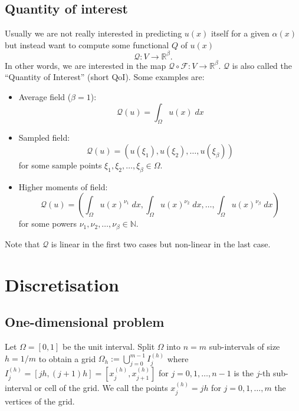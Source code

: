 \documentclass[11pt]{article}
\begin{document}
\subsection{Quantity of interest}
Usually we are not really interested in predicting $u(x)$ itself for a given $\alpha(x)$ but instead want to compute some functional $Q$ of $u(x)$
\begin{equation}
    \mathcal{Q}: V\rightarrow \mathbb{R}^\beta.\label{eqn:QoI}
\end{equation}
In other words, we are interested in the map $\mathcal{Q}\circ \mathcal{F}:V\rightarrow \mathbb{R}^\beta$. $\mathcal{Q}$ is also called the ``Quantity of Interest'' (short QoI). Some examples are:
\begin{itemize}
    \item Average field ($\beta=1$):
    \begin{equation}
        \mathcal{Q}(u) = \int_\Omega u(x)\;dx
    \end{equation}
    \item Sampled field:
    \begin{equation}
        \mathcal{Q}(u) = (u(\xi_1),u(\xi_2),\dots,u(\xi_\beta))
    \end{equation}
     for some sample points $\xi_1,\xi_2,\dots,\xi_\beta\in\Omega$.
    \item Higher moments of field:
    \begin{equation}
        \mathcal{Q}(u) = \left(\int_\Omega u(x)^{\nu_1}\;dx,\int_\Omega u(x)^{\nu_2}\;dx,\dots,\int_\Omega u(x)^{\nu_\beta}\;dx\right)
    \end{equation}
    for some powers $\nu_1,\nu_2,\dots,\nu_\beta\in\mathbb{N}$.
\end{itemize}
Note that $\mathcal{Q}$ is linear in the first two cases but non-linear in the last case.
\section{Discretisation}
\subsection{One-dimensional problem}
Let $\Omega = [0,1]$ be the unit interval. Split $\Omega$ into $n=m$ sub-intervals of size $h=1/m$ to obtain a grid \mbox{$\Omega_h := \bigcup_{j=0}^{m-1} I_j^{(h)}$} where $I_j^{(h)}=[jh,(j+1)h]=[x^{(h)}_j,x^{(h)}_{j+1}]$ for $j=0,1,\dots,n-1$ is the $j$-th sub-interval or cell of the grid. We call the points $x^{(h)}_j=jh$ for $j=0,1,\dots,m$ the vertices of the grid.
\end{document}
